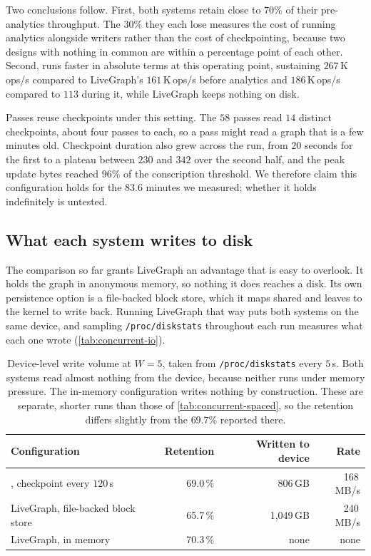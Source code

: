 Two conclusions follow.
First, both systems retain close to $70\%$ of their pre-analytics throughput.
The $30\%$ they each lose measures the cost of running analytics alongside writers rather than the cost of checkpointing, because two designs with nothing in common are within a percentage point of each other.
Second, \project{} runs faster in absolute terms at this operating point, sustaining $267$\,K\,ops/s compared to LiveGraph's $161$\,K\,ops/s before analytics and $186$\,K\,ops/s compared to $113$ during it, while LiveGraph keeps nothing on disk.

Passes reuse checkpoints under this setting.
The $58$ passes read $14$ distinct checkpoints, about four passes to each, so a pass might read a graph that is a few minutes old.
Checkpoint duration also grew across the run, from $20$ seconds for the first to a plateau between $230$ and $342$ over the second half, and the peak update bytes reached $96\%$ of the conscription threshold.
We therefore claim this configuration holds for the $83.6$ minutes we measured; whether it holds indefinitely is untested.

\subsection{What each system writes to disk}
\label{sec:eval:dynamic:concurrent:io}

The comparison so far grants LiveGraph an advantage that is easy to overlook.
It holds the graph in anonymous memory, so nothing it does reaches a disk.
Its own persistence option is a file-backed block store, which it maps shared and leaves to the kernel to write back.
Running LiveGraph that way puts both systems on the same device, and sampling \texttt{/proc/diskstats} throughout each run measures what each one wrote (\autoref{tab:concurrent-io}).

\begin{table}[t]
  \centering
  \setlength{\tabcolsep}{5pt}\renewcommand{\arraystretch}{1.05}
  \small
  \begin{tabular}{l r r r}
  \toprule
  Configuration & Retention & Written to device & Rate \\
  \midrule
  \project{}, checkpoint every $120$\,s & 69.0\,\% & 806\,GB & 168\,MB/s \\
  LiveGraph, file-backed block store    & 65.7\,\% & 1{,}049\,GB & 240\,MB/s \\
  LiveGraph, in memory                  & 70.3\,\% & none & none \\
  \bottomrule
  \end{tabular}
  \caption{Device-level write volume at $W=5$, taken from \texttt{/proc/diskstats} every $5$\,s.
  Both systems read almost nothing from the device, because neither runs under memory pressure.
  The in-memory configuration writes nothing by construction.
  These are separate, shorter runs than those of \autoref{tab:concurrent-spaced}, so the \project{} retention differs slightly from the $69.7\%$ reported there.}
  \label{tab:concurrent-io}
\end{table}

